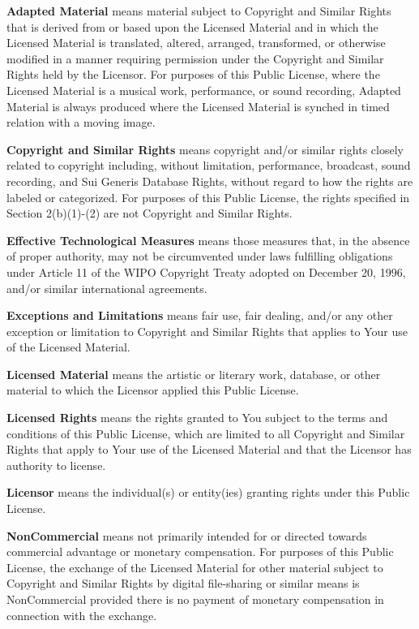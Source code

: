 \begin{doclicense@enumerate}
\item \textbf{Adapted Material} means material subject to Copyright and Similar Rights that is derived from or based upon the Licensed Material and in which the Licensed Material is translated, altered, arranged, transformed, or otherwise modified in a manner requiring permission under the Copyright and Similar Rights held by the Licensor. For purposes of this Public License, where the Licensed Material is a musical work, performance, or sound recording, Adapted Material is always produced where the Licensed Material is synched in timed relation with a moving image.
\item \textbf{Copyright and Similar Rights} means copyright and/or similar rights closely related to copyright including, without limitation, performance, broadcast, sound recording, and Sui Generis Database Rights, without regard to how the rights are labeled or categorized. For purposes of this Public License, the rights specified in Section 2(b)(1)-(2) are not Copyright and Similar Rights.
\item \textbf{Effective Technological Measures} means those measures that, in the absence of proper authority, may not
be circumvented under laws fulfilling obligations under Article 11 of the WIPO Copyright Treaty adopted on December 20, 1996, and/or similar
international agreements.
\item \textbf{Exceptions and Limitations} means fair use, fair dealing, and/or any other exception or limitation to Copyright and Similar Rights that applies to Your use of the Licensed Material.
\item \textbf{Licensed Material} means the artistic or literary work, database, or other material to which the Licensor applied this Public License.
\item \textbf{Licensed Rights} means the rights granted to You subject to the terms and conditions of this Public License, which are limited to all Copyright and Similar Rights that apply to Your use of the Licensed Material and that the Licensor has authority to license.
\item \textbf{Licensor} means the individual(s) or entity(ies) granting rights under this Public License.
\item \textbf{NonCommercial} means not primarily intended for or directed towards commercial advantage or monetary compensation. For purposes of this Public License, the exchange of the Licensed Material for other material subject to Copyright and Similar Rights by digital file-sharing or similar means is NonCommercial provided there is no payment of monetary compensation in connection with the exchange.

\end{doclicense@enumerate}
